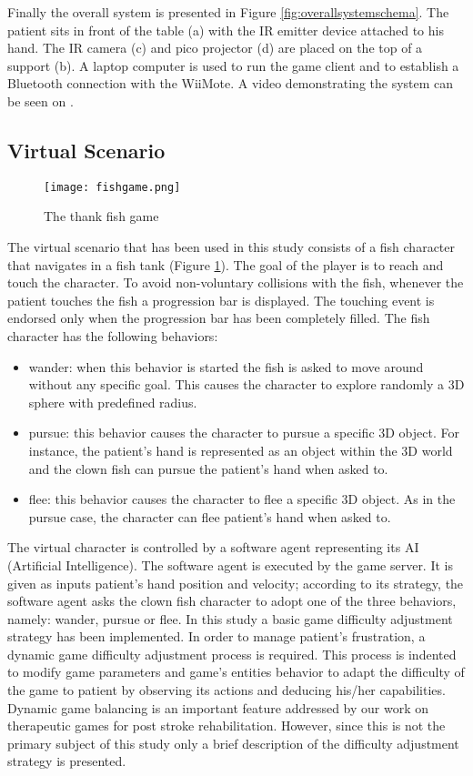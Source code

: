 \documentclass[preprint,authoryear,12pt]{elsarticle}
\begin{document}
Finally the overall system is presented in Figure \ref{fig:overallsystemschema}.  The patient sits in front of the table (a) with the IR emitter device attached to his hand. The IR camera (c) and pico projector (d) are placed on the top of a support (b). A laptop computer is used to run the game client and to establish a Bluetooth connection with the WiiMote. A video demonstrating the system can be seen on \citep{fishtank}.

\subsection{Virtual Scenario}
\label{game}

\begin{figure}[h]
	\centering
		\texttt{[image: fishgame.png]}
	\caption{The thank fish game}
	\label{fig:fishgame}
\end{figure}


The virtual scenario that has been used in this study consists of a fish character that navigates in a fish tank (Figure \ref{fig:fishgame}). The goal of the player is to reach and touch the character. To avoid non-voluntary collisions with the fish, whenever the patient touches the fish a progression bar is displayed. The touching event is endorsed only when the progression bar has been completely filled.
The fish character has the following behaviors:

\begin{itemize}
\item wander: when this behavior is started the fish is asked to move around without any specific goal. This causes the character to explore randomly a 3D sphere with predefined radius.
\item pursue: this behavior causes the character to pursue a specific 3D object. For instance, the patient's hand is represented as an object within the 3D world and the clown fish can pursue the patient's hand when asked to.
\item flee: this behavior causes the character to flee a specific 3D object. As in the pursue case, the character can flee patient's hand when asked to.
\end{itemize}

The virtual character is controlled by a software agent representing its AI (Artificial Intelligence). The software agent is executed by the game server. It is given as inputs patient's hand position and velocity; according to its strategy, the software agent asks the clown fish character to adopt one of the three behaviors, namely: wander, pursue or flee. In this study a basic game difficulty adjustment strategy has been implemented.
In order to manage patient's frustration, a dynamic game difficulty adjustment process is required. This process is indented to modify game parameters and game's entities behavior to adapt the difficulty of the game to patient by observing its actions and deducing his/her capabilities.
Dynamic game balancing is an important feature addressed by our work on therapeutic games for post stroke rehabilitation. However, since this is not the primary subject of this study only a brief description of the difficulty adjustment strategy is presented.
  
\end{document}
